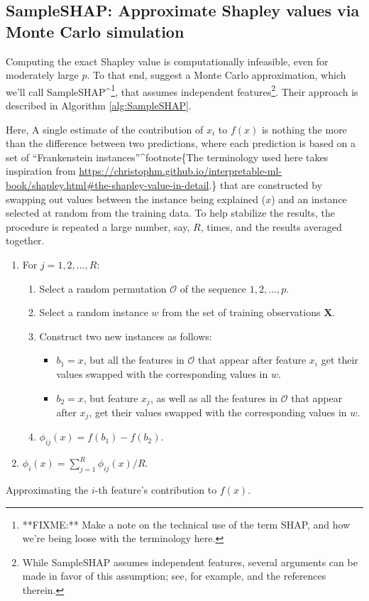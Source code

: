 \subsection{SampleSHAP: Approximate Shapley values via Monte Carlo simulation \label{sec:SampleSHAP}}

Computing the exact Shapley value is computationally infeasible, even
for moderately large \(p\). To that end,
\citet{strumbelj-2014-explaining} suggest a Monte Carlo approximation,
which we'll call
SampleSHAP\^{}\footnote{**FIXME:** Make a note on the technical use of the term SHAP, and how we're being loose with the terminology here.},
that assumes independent
features\footnote{While SampleSHAP assumes independent features, several arguments can be made in favor of this assumption; see, for example, \citet{chen-2020-true} and the references therein.}.
Their approach is described in Algorithm \ref{alg:SampleSHAP}.

Here, A single estimate of the contribution of \(x_i\) to
\(f\left(x\right)\) is nothing the more than the difference between two
predictions, where each prediction is based on a set of ``Frankenstein
instances''\^{}footnote\{The terminology used here takes inspiration
from
\url{https://christophm.github.io/interpretable-ml-book/shapley.html#the-shapley-value-in-detail}.\}
that are constructed by swapping out values between the instance being
explained (\(x\)) and an instance selected at random from the training
data. To help stabilize the results, the procedure is repeated a large
number, say, \(R\), times, and the results averaged together.

\begin{algorithm}
\begin{enumerate}
  \item For $j = 1, 2, \dots, R$:
  \begin{enumerate}
    \item Select a random permutation $\mathcal{O}$ of the sequence $1, 2, \dots, p$.
    \item Select a random instance $w$ from the set of training observations $\boldsymbol{X}$.
    \item Construct two new instances as follows:
    \begin{itemize}
      \item $b_1 = x$, but all the features in $\mathcal{O}$ that appear after feature $x_i$ get their values swapped with the corresponding values in $w$.
      \item $b_2 = x$, but feature $x_j$, as well as all the features in $\mathcal{O}$ that appear after $x_j$, get their values swapped with the corresponding values in $w$.
    \end{itemize}
    \item $\phi_{ij}\left(x\right) = f\left(b_1\right) - f\left(b_2\right)$.
  \end{enumerate}
  \item $\phi_i\left(x\right) = \sum_{j = 1} ^ R \phi_{ij}\left(x\right) / R$.
\end{enumerate}
\caption{Approximating the $i$-th feature's contribution to $f\left(x\right)$. \label{alg:SampleSHAP}}
\end{algorithm}

